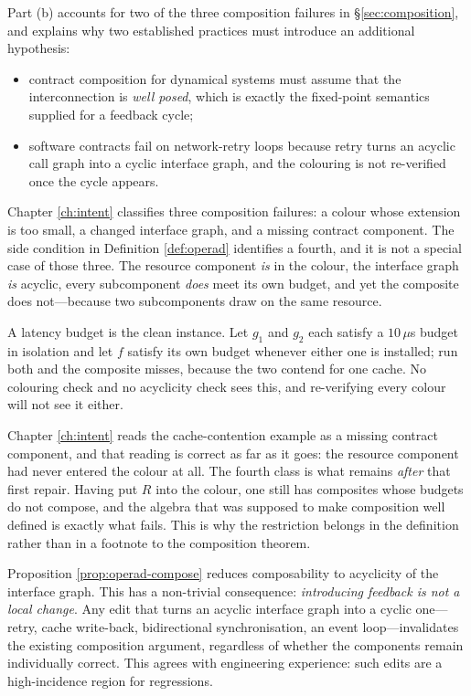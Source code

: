 Part (b) accounts for two of the three composition failures in \S\ref{sec:composition}, and
explains why two established practices must introduce an additional hypothesis:

\begin{itemize}
\item contract composition for dynamical systems must assume that the interconnection is
      \emph{well posed}, which is exactly the fixed-point semantics supplied for a feedback
      cycle;
\item software contracts fail on network-retry loops because retry turns an acyclic call
      graph into a cyclic interface graph, and the colouring is not re-verified once the
      cycle appears.
\end{itemize}

\begin{remark}\label{rmk:resource-coupling}
Chapter \ref{ch:intent} classifies three composition failures: a colour whose extension is too
small, a changed interface graph, and a missing contract component. The side condition in
Definition \ref{def:operad} identifies a fourth, and it is not a special case of those three.
The resource component \emph{is} in the colour, the interface graph \emph{is} acyclic, every
subcomponent \emph{does} meet its own budget, and yet the composite does not---because two
subcomponents draw on the same resource.

A latency budget is the clean instance. Let $g_1$ and $g_2$ each satisfy a $10\,\mu$s budget in
isolation and let $f$ satisfy its own budget whenever either one is installed; run both and the
composite misses, because the two contend for one cache. No colouring check and no acyclicity
check sees this, and re-verifying every colour will not see it either.

Chapter \ref{ch:intent} reads the cache-contention example as a missing contract component, and
that reading is correct as far as it goes: the resource component had never entered the colour at
all. The fourth class is what remains \emph{after} that first repair. Having put $R$ into the
colour, one still has composites whose budgets do not compose, and the algebra that was supposed to
make composition well defined is exactly what fails. This is why the restriction belongs in the
definition rather than in a footnote to the composition theorem.
\end{remark}

\begin{remark}\label{rmk:feedback}
Proposition \ref{prop:operad-compose} reduces composability to acyclicity of the interface
graph. This has a non-trivial consequence: \emph{introducing feedback is not a local
change}. Any edit that turns an acyclic interface graph into a cyclic one---retry, cache
write-back, bidirectional synchronisation, an event loop---invalidates the existing
composition argument, regardless of whether the components remain individually correct.
This agrees with engineering experience: such edits are a high-incidence region for
regressions.
\end{remark}

